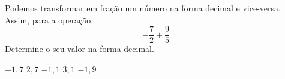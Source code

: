 Podemos transformar em fração um número na forma decimal e vice-versa. Assim, para a operação
\[-\frac{7}{2}+\frac{9}{5}\]
Determine o seu valor na forma decimal.

$-1{,}7$
$ 2{,}7$
$-1{,}1$
$ 3{,}1$
$-1{,}9$




